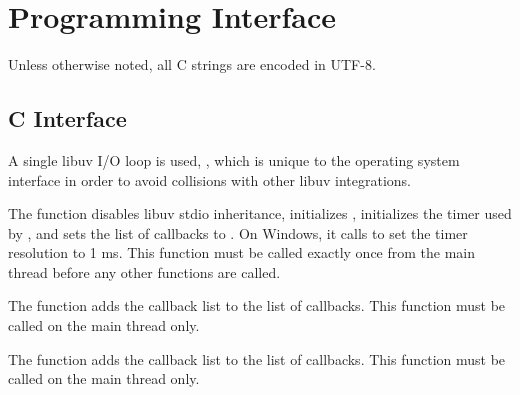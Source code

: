 \section {Programming Interface}\label{sec:osi-api}

Unless otherwise noted, all C strings are encoded in UTF-8.

\subsection {C Interface}

A single libuv I/O loop is used, , which is unique to
the operating system interface in order to avoid collisions with other
libuv integrations.

\begin{function}
\end{function}

The  function disables libuv stdio inheritance,
initializes , initializes the timer used by
, and sets the list of callbacks to
\code{()}. On Windows, it calls  to set the
timer resolution to 1 ms. This function must be called exactly once
from the main thread before any other  functions are
called.

\begin{function}
\end{function}

The  function adds the callback list
 to the list of callbacks. This
function must be called on the main thread only.

\begin{function}
\end{function}

The  function adds the callback list
 to the list of callbacks. This
function must be called on the main thread only.

\begin{function}
\end{function}

